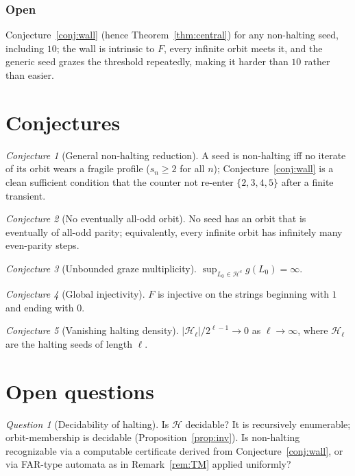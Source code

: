 \documentclass[11pt,reqno]{amsart}
\theoremstyle{plain}
\theoremstyle{definition}
\theoremstyle{remark}
\newtheorem{conjecture}{Conjecture}
\newtheorem{question}{Question}
\begin{document}
\subsubsection*{Open} Conjecture~\ref{conj:wall} (hence Theorem~\ref{thm:central}) for any non-halting seed, including $10$; the wall is intrinsic to $F$, every infinite orbit meets it, and the generic seed grazes the threshold repeatedly, making it harder than $10$ rather than easier.

\section{Conjectures}\label{sec:conj}
\begin{conjecture}[General non-halting reduction]\label{conj:reduction}
A seed is non-halting iff no iterate of its orbit wears a fragile profile ($s_n\ge 2$ for all $n$); Conjecture~\ref{conj:wall} is a clean sufficient condition that the counter not re-enter $\{2,3,4,5\}$ after a finite transient.
\end{conjecture}

\begin{conjecture}[No eventually all-odd orbit]\label{conj:noallodd}
No seed has an orbit that is eventually of all-odd parity; equivalently, every infinite orbit has infinitely many even-parity steps.
\end{conjecture}

\begin{conjecture}[Unbounded graze multiplicity]\label{conj:graze}
$\sup_{L_0\in\mathcal H^c} g(L_0)=\infty$.
\end{conjecture}

\begin{conjecture}[Global injectivity]\label{conj:inj}
$F$ is injective on the strings beginning with $1$ and ending with $0$.
\end{conjecture}

\begin{conjecture}[Vanishing halting density]\label{conj:density}
$|\mathcal H_\ell|/2^{\ell-1}\to 0$ as $\ell\to\infty$, where $\mathcal H_\ell$ are the halting seeds of length $\ell$.
\end{conjecture}

\section{Open questions}\label{sec:open}
\begin{question}[Decidability of halting]\label{q:dec}
Is $\mathcal H$ decidable? It is recursively enumerable; orbit-membership is decidable (Proposition~\ref{prop:inv}). Is non-halting recognizable via a computable certificate derived from Conjecture~\ref{conj:wall}, or via FAR-type automata as in Remark~\ref{rem:TM} applied uniformly?
\end{question}
\end{document}
